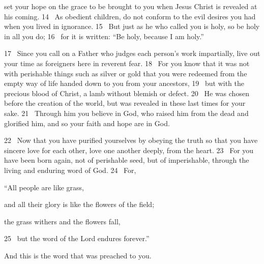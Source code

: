 set your hope
on the grace to be brought to you
when Jesus Christ is revealed at his coming.
14 
As obedient
children, do not conform
to the evil desires you had when you lived in ignorance.
15 
But just as he who called you is holy, so be holy in all you do;
16 
for it is written: “Be holy, because I am holy.”
\par
17 
Since you call on a Father
who judges each person’s work
impartially,
live out your time as foreigners
here in reverent fear.
18 
For you know that it was not with perishable things such as silver or gold that you were redeemed
from the empty way of life
handed down to you from your ancestors,
19 
but with the precious blood
of Christ, a lamb
without blemish or defect.
20 
He was chosen before the creation of the world,
but was revealed in these last times
for your sake.
21 
Through him you believe in God,
who raised him from the dead
and glorified him,
and so your faith and hope
are in God.
\par
22 
Now that you have purified
yourselves by obeying
the truth so that you have sincere love for each other, love one another deeply,
from the heart.
23 
For you have been born again,
not of perishable seed, but of imperishable,
through the living and enduring word of God.
24 
For,
\par
“All people are like grass,
\par
and all their glory is like the flowers of the field;
\par
the grass withers and the flowers fall,
\par
25 
but the word of the Lord endures forever.”
\par
And this is the word that was preached to you.



\bye

